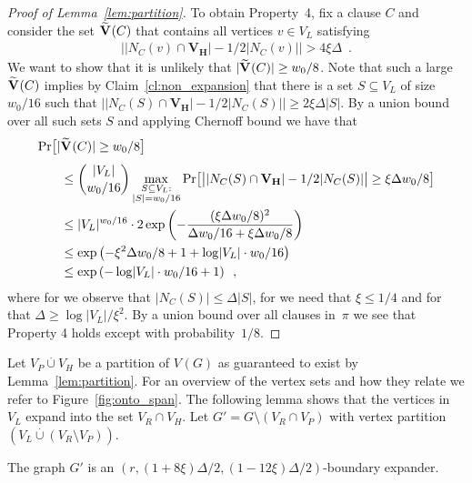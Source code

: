 \documentclass{article}
\providecommand{\abs}[1]{\lvert#1\rvert}
\providecommand{\Abs}[1]{\bigl\lvert#1\bigr\rvert}
\newcommand{\Prob}[2][]{\Pr_{#1} \bigl[ #2 \bigr]}
\newcommand{\Setsize}[1]{\bigl\lvert#1\bigr\rvert}
\newcommand{\setsize}[1]{\lvert#1\rvert}
\newcommand{\disjointunion}{\overset{.}{\cup}}
\newcommand{\eqperiod}{\enspace .}
\newcommand{\eqcomma}{\enspace ,}
\newcommand{\reffig}[1]{Figure~\ref{#1}}
\newcommand{\refthm}[1]{Theorem~\ref{#1}}
\newcommand{\refpi}{\pi}
\newcommand{\neigh}[2][]{N_{{#1}}(#2)}
\newcommand{\diff}{\xi}
\newcommand{\GdegMax}{\Delta}
\newcommand{\V}[1][]{V_{#1}}
\newcommand{\Vl}{\V[L]}
\newcommand{\Vr}{\V[R]}
\newcommand{\Vp}{\V[P]}
\newcommand{\Vh}{\V[H]}
\newcommand{\Gprime}{G'}
\newcommand{\GprimeConstantDeg}{8}
\newcommand{\GprimeConstantExp}{12}
\newcommand{\Vbad}[2][]{\widetilde V^{#1}(#2)}
\numberwithin{equation}{section}
\begin{document}
\begin{proof}[Proof of Lemma~\ref{lem:partition}]
  To obtain Property~4, fix a clause $C$ and consider the set 
  ${\mathbf{\Vbad{ \mathnormal{C} } }}$ that contains
  all vertices $v\in \Vl$ satisfying
  \begin{align}
    \Abs{ \abs{ \neigh[C]{v} \cap {\mathbf{\Vh}} } - 
    1/2\abs{ \neigh[C]{v} } } > 
    4 \diff \GdegMax \eqperiod
  \end{align}
  We want to show that it is unlikely 
  that $\setsize{\mathbf{\Vbad{ \mathnormal{C} } }} \geq w_0/8$.
  Note that such a large $\mathbf{\Vbad{ \mathnormal{C} } }$
  implies by Claim~\ref{cl:non_expansion} that there
  is a set $S \subseteq \Vl$ of size $w_0/16$
  such that 
  $\Setsize{ \setsize{ \neigh[C]{S} \cap \mathbf{\Vh} } - 
    1/2\abs{ \neigh[C]{ S }}}
  \ge
  2 \diff \GdegMax \setsize{ S }$.
  By a union bound over all such sets $S$
  and applying Chernoff bound\ifthenelse{\boolean{false}}{}{~(\refthm{thm:Chernoff})} 
  we have that
  \begin{align}\nonumber
    \Prob{\setsize{&\mathbf{\Vbad{ \mathnormal{C} } }} \geq w_0/8}\\
      & \leq
        \binom{\setsize{\Vl}}{w_0/16} 
        \max_{\substack{S \subseteq \Vl:\\ \setsize{S}=w_0/16}}
    \Prob{\Setsize{ \setsize{ \neigh[C]{S} \cap \mathbf{\Vh} } - 
    1/2\abs{ \neigh[C]{ S }}}
    \ge
    \diff \GdegMax w_0/8 }\\ 
    \label{eq:part_one}
      & \leq
        \setsize{\Vl}^{w_0/16} \cdot 
        2 \exp\left( -
        \frac{(\diff \GdegMax w_0/8 )^2}{ \GdegMax w_0/16 + 
        \diff \GdegMax w_0/8  }\right) \\ 
    \label{eq:part_two}
      & \leq
        \exp\left({- \diff^2 \GdegMax w_0/8 }+ 1 + 
        \log \setsize{\Vl} \cdot  w_0/16\right) \\ 
    \label{eq:part_three}
      & \leq
        \exp\left(-\log \setsize{\Vl} \cdot w_0/16 + 1 \right)
        \eqcomma
  \end{align}
  where for  we observe that
  $\abs{ \neigh[C]{ S }} \leq \GdegMax \setsize{S}$, for 
   we need that $\diff \leq 1 / 4$
  and for  that
  ${\GdegMax \geq \log \setsize{\Vl}/\diff^2}$. 
  By a union bound over all clauses in~$\refpi$ we see
  that Property 4 holds except with probability~$1/8$.
\end{proof}


Let $\Vp \disjointunion \Vh$ be a partition of $\V(G)$ as 
guaranteed to exist by Lemma~\ref{lem:partition}. For an overview of the
vertex sets and how they relate we refer to \reffig{fig:onto_span}.
The following lemma shows that the vertices in $\Vl$ expand into the
set $\Vr \cap \Vh$. Let $\Gprime = G \setminus (\Vr \cap \Vp)$ 
with vertex partition $(\Vl \disjointunion (\Vr\setminus\Vp))$.
\begin{lemma}\label{lem:expansion_Gprime}
  The graph $\Gprime$ is an
  $(r, (1 + \GprimeConstantDeg \diff) \GdegMax/2, 
  (1 - \GprimeConstantExp \diff) \GdegMax/2)$-boundary 
  expander. 
\end{lemma}
\end{document}
